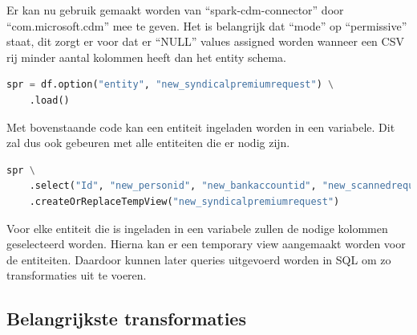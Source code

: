 Er kan nu gebruik gemaakt worden van ``spark-cdm-connector'' door ``com.microsoft.cdm'' mee te geven. Het is belangrijk dat ``mode'' op ``permissive'' staat, dit zorgt er voor dat er ``NULL'' values assigned worden wanneer een CSV rij minder aantal kolommen heeft dan het entity schema.


\begin{lstlisting}[language=Python, caption={Ophalen van entiteit uit Azure Data Lake van Azure Databricks.}, style=myStyle]
spr = df.option("entity", "new_syndicalpremiumrequest") \
    .load()
\end{lstlisting}

Met bovenstaande code kan een entiteit ingeladen worden in een variabele. Dit zal dus ook gebeuren met alle entiteiten die er nodig zijn.


\begin{lstlisting}[language=Python, caption={Aanmaken van temporary view in Azure Databricks.}, style=myStyle]
spr \
    .select("Id", "new_personid", "new_bankaccountid", "new_scannedrequestcode", "new_isdeclarationonhonour", "new_requesttypeid", "new_formnumber", "new_treatmentstate", "new_feedback", "new_reasonforcontrol", "new_yearid", "createdon", "new_idadm", "new_contributionamount", "new_premiumamount", "new_paymentdate", "new_remarkgroupfinal", "new_groupid") \
    .createOrReplaceTempView("new_syndicalpremiumrequest")
\end{lstlisting}

Voor elke entiteit die is ingeladen in een variabele zullen de nodige kolommen geselecteerd worden. Hierna kan er een temporary view aangemaakt worden voor de entiteiten. Daardoor kunnen later queries uitgevoerd worden in SQL om zo transformaties uit te voeren.

\subsection{Belangrijkste transformaties}

